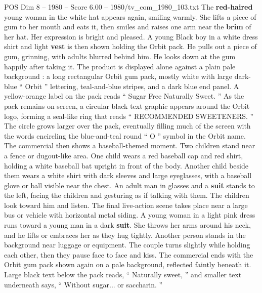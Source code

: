 \begin{textsample}{POS Dim 8 – 1980 – Score 6.00 – 1980/tv\_com\_1980\_103.txt}
The \textbf{red-haired} young woman in the white hat appears again, smiling warmly.
She lifts a piece of gum to her mouth and eats it, then smiles and raises one arm near the \textbf{brim} of her hat.
Her expression is bright and pleased.
A young Black boy in a white dress shirt and light \textbf{vest} is then shown holding the Orbit pack.
He pulls out a piece of gum, grinning, with adults blurred behind him.
He looks down at the gum happily after taking it.
The product is displayed alone against a plain pale background : a long rectangular Orbit gum pack, mostly white with large dark-blue “ Orbit ” lettering, teal-and-blue stripes, and a dark blue end panel.
A yellow-orange label on the pack reads “ Sugar Free Naturally Sweet. ” As the pack remains on screen, a circular black text graphic appears around the Orbit logo, forming a seal-like ring that reads “ RECOMMENDED SWEETENERS. ” The circle grows larger over the pack, eventually filling much of the screen with the words encircling the blue-and-teal round “ O ” symbol in the Orbit name.
The commercial then shows a baseball-themed moment.
Two children stand near a fence or dugout-like area.
One child wears a red baseball cap and red shirt, holding a white baseball bat upright in front of the body.
Another child beside them wears a white shirt with dark sleeves and large eyeglasses, with a baseball glove or ball visible near the chest.
An adult man in glasses and a \textbf{suit} stands to the left, facing the children and gesturing as if talking with them.
The children look toward him and listen.
The final live-action scene takes place near a large bus or vehicle with horizontal metal siding.
A young woman in a light pink dress runs toward a young man in a dark \textbf{suit}.
She throws her arms around his neck, and he lifts or embraces her as they hug tightly.
Another person stands in the background near luggage or equipment.
The couple turns slightly while holding each other, then they pause face to face and kiss.
The commercial ends with the Orbit gum pack shown again on a pale background, reflected faintly beneath it.
Large black text below the pack reads, “ Naturally sweet, ” and smaller text underneath says, “ Without sugar... or saccharin. ”

\end{textsample}
